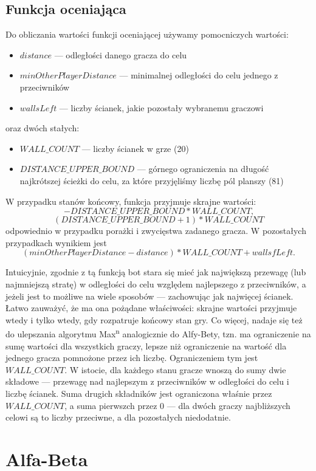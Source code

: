 \documentclass{pracamgr}
\begin{document}
\subsection{Funkcja oceniająca}

Do obliczania wartości funkcji oceniającej używamy pomocniczych wartości:
\begin{itemize}
\item \(distance\) --- odległości danego gracza do celu
\item \(minOtherPlayerDistance\) --- minimalnej odległości do celu jednego z przeciwników
\item \(wallsLeft\) --- liczby ścianek, jakie pozostały wybranemu graczowi
\end{itemize}
oraz dwóch stałych:
\begin{itemize}
\item \(WALL\_COUNT\) --- liczby ścianek w grze (20)
\item \(DISTANCE\_UPPER\_BOUND\) --- górnego ograniczenia na długość najkrótszej ścieżki do celu, za które przyjęliśmy liczbę pól planszy (81)
\end{itemize}
W przypadku stanów końcowy, funkcja przyjmuje skrajne wartości: \[-DISTANCE\_UPPER\_BOUND * WALL\_COUNT \text{,}\] \[(DISTANCE\_UPPER\_BOUND + 1) * WALL\_COUNT\] odpowiednio w przypadku porażki i zwycięstwa zadanego gracza.
W pozostałych przypadkach wynikiem jest \[(minOtherPlayerDistance - distance) * WALL\_COUNT + wallsfLeft \text{.}\]

Intuicyjnie, zgodnie z tą funkcją bot stara się mieć jak największą przewagę (lub najmniejszą stratę) w odległości do celu względem najlepszego z przeciwników, a jeżeli jest to możliwe na wiele sposobów --- zachowując jak najwięcej ścianek.
Łatwo zauważyć, że ma ona pożądane właściwości: skrajne wartości przyjmuje wtedy i tylko wtedy, gdy rozpatruje końcowy stan gry.
Co więcej, nadaje się też do ulepszania algorytmu Max\textsuperscript{n} analogicznie do Alfy-Bety, tzn. ma ograniczenie na sumę wartości dla wszystkich graczy, lepsze niż ograniczenie na wartość dla jednego gracza pomnożone przez ich liczbę.
Ograniczeniem tym jest \(WALL\_COUNT\).
W istocie, dla każdego stanu gracze wnoszą do sumy dwie składowe --- przewagę nad najlepszym z przeciwników w odległości do celu i liczbę ścianek.
Suma drugich składników jest ograniczona właśnie przez \(WALL\_COUNT\), a suma pierwszch przez \(0\) --- dla dwóch graczy najbliższych celowi są to liczby przeciwne, a dla pozostałych niedodatnie.

\section {Alfa-Beta}
\end{document}
